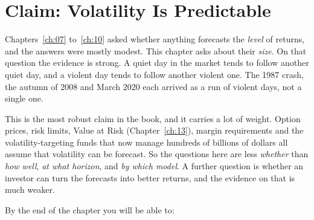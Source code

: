 \makeatletter
{}
\makeatother

\chapter{Claim: Volatility Is Predictable}
\label{ch:11}

Chapters~\ref{ch:07} to~\ref{ch:10} asked whether anything forecasts the \emph{level} of returns, and the answers were mostly modest. This chapter asks about their \emph{size}. On that question the evidence is strong. A quiet day in the market tends to follow another quiet day, and a violent day tends to follow another violent one. The 1987 crash, the autumn of 2008 and March 2020 each arrived as a run of violent days, not a single one.

This is the most robust claim in the book, and it carries a lot of weight. Option prices, risk limits, Value at Risk (Chapter~\ref{ch:13}), margin requirements and the volatility-targeting funds that now manage hundreds of billions of dollars all assume that volatility can be forecast. So the questions here are less \emph{whether} than \emph{how well}, \emph{at what horizon}, and \emph{by which model}. A further question is whether an investor can turn the forecasts into better returns, and the evidence on that is much weaker.

By the end of the chapter you will be able to:

